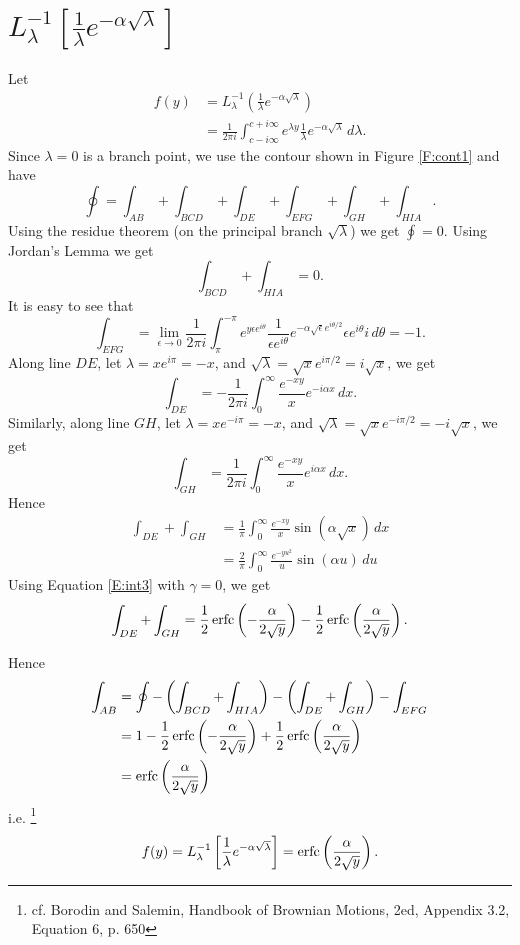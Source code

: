 \section{$ L_{\lambda}^{-1}[ 
  \frac{1}{\lambda} e^{-\alpha \sqrt{\lambda}} ] $ }
Let
\begin{align*}
  f(y) &= L_{\lambda}^{-1} 
          \left( 
            \frac{1}{\lambda} e^{-\alpha \sqrt{\lambda}} 
          \right)    \\
       &= \frac{1}{2\pi i}   
          \int_{c-i\infty}^{c+i\infty} e^{\lambda y} 
            \frac{1}{\lambda} e^{-\alpha \sqrt{\lambda}}  
            \, d\lambda.
\end{align*}
Since $\lambda=0$ is a branch point, we use the contour shown in Figure
\ref{F:cont1} and have
\[
  \oint = \int_{AB} + \int_{BCD} + \int_{DE} + \int_{EFG} + \int_{GH}
          + \int_{HIA}.
\]
Using the residue theorem (on the principal branch $\sqrt{\lambda}$) we get 
$\oint=0$. Using Jordan's Lemma we get
\[
  \int_{BCD} + \int_{HIA} = 0.
\]
It is easy to see that 
\[
  \int_{EFG} = \lim_{\epsilon \to 0} \frac{1}{2\pi i}
               \int_{\pi}^{-\pi} e^{y \epsilon e^{i\theta}}
               \frac{1}{\epsilon e^{i\theta}}
               e^{-\alpha \sqrt{\epsilon} e^{i\theta/2}}
               \epsilon e^{i\theta} i \, d\theta
             = -1.
\]
Along line $DE$, let $\lambda=x e^{i\pi}=-x$, and 
$\sqrt{\lambda}=\sqrt{x} e^{i\pi/2}=i\sqrt{x}$, we get
\[
  \int_{DE} = -\frac{1}{2\pi i} \int_0^{\infty} \frac{e^{-xy}}{x}
              e^{-i\alpha x} \, dx.
\]
Similarly, along line $GH$, let $\lambda=x e^{-i\pi}=-x$, and 
$\sqrt{\lambda}=\sqrt{x} e^{-i\pi/2}=-i\sqrt{x}$, we get
\[
  \int_{GH} = \frac{1}{2\pi i} \int_0^{\infty} \frac{e^{-xy}}{x}
              e^{i\alpha x} \, dx.
\]
Hence
\begin{align*}
  \int_{DE} + \int_{GH} 
    &= \frac{1}{\pi} 
      \int_0^{\infty} \frac{ e^{-xy} }{ x } \sin( \alpha \sqrt{x} ) \, dx \\
    &= \frac{2}{\pi} \int_0^{\infty} \frac{e^{-yu^2}}{u} \sin(\alpha u) \, du
\end{align*}
Using Equation \ref{E:int3} with $\gamma=0$, we get
\[
  \int_{DE} + \int_{GH} 
    =   \frac{1}{2} \operatorname*{erfc} \left( -\frac{\alpha}{2\sqrt{y}} \right)
      - \frac{1}{2} \operatorname*{erfc} \left( \frac{\alpha}{2\sqrt{y}}  \right).
\]

Hence 
\begin{align*}
  \int_{AB} 
	&= \oint - \left( \int_{BCD} + \int_{HIA} \right)
     - \left( \int_{DE} + \int_{GH} \right) - \int_{EFG}  \\
    & = 1 - \frac{1}{2} \operatorname*{erfc} \left( -\frac{\alpha}{2\sqrt{y}} \right)
          + \frac{1}{2} \operatorname*{erfc} \left( \frac{\alpha}{2\sqrt{y}}  \right) \\
    &= \operatorname*{erfc} \left( \frac{\alpha}{2\sqrt{y}} \right) 
\end{align*}
i.e.
\footnote{cf. Borodin and Salemin, Handbook of Brownian Motions, 2ed, Appendix
3.2, Equation 6, p. 650}
\begin{equation}  \label{E:ilt3}
  f(y) = L_{\lambda}^{-1} 
         \left[ 
           \frac{1}{\lambda} e^{-\alpha \sqrt{\lambda}}
         \right]
       = \operatorname*{erfc} \left( \frac{\alpha}{2\sqrt{y}} \right).
\end{equation}


